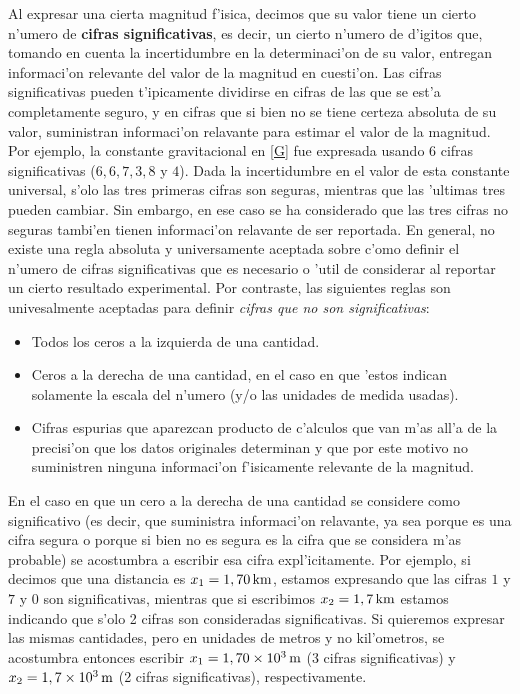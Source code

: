 Al expresar una cierta magnitud f'isica, decimos que su valor tiene un cierto n'umero de \textbf{cifras significativas}, es decir, un cierto n'umero de d'igitos que, tomando en cuenta la incertidumbre en la determinaci'on de su valor, entregan informaci'on relevante del valor de la magnitud en cuesti'on. Las cifras significativas pueden t'ipicamente dividirse en cifras de las que se est'a completamente seguro, y en cifras que si bien no se tiene certeza absoluta de su valor, suministran informaci'on relavante para estimar el valor de la magnitud. Por ejemplo, la constante gravitacional en \eqref{G} fue expresada usando 6 cifras significativas ($6, 6, 7, 3, 8$ y $4$). Dada la incertidumbre en el valor de esta constante universal, s'olo las tres primeras cifras son seguras, mientras que las 'ultimas tres pueden cambiar. Sin embargo, en ese caso se ha considerado que las tres cifras no seguras tambi'en tienen informaci'on relavante de ser reportada. En general, no existe una regla absoluta y universamente aceptada sobre c'omo definir el n'umero de cifras significativas que es necesario o 'util de considerar al reportar un cierto resultado experimental. Por contraste, las siguientes reglas son univesalmente aceptadas para definir \textit{cifras que no son significativas}:
\begin{itemize}
\item Todos los ceros a la izquierda de una cantidad.
\item Ceros a la derecha de una cantidad, en el caso en que 'estos indican solamente la escala del n'umero (y/o las unidades de medida usadas).
\item Cifras espurias que aparezcan producto de c'alculos que van m'as all'a de la precisi'on que los datos originales determinan y que por este motivo no suministren ninguna informaci'on f'isicamente relevante de la magnitud.
\end{itemize}

En el caso en que un cero a la derecha de una cantidad se considere como significativo (es decir, que suministra informaci'on relavante, ya sea porque es una cifra segura o porque si bien no es segura es la cifra que se considera m'as probable) se acostumbra a escribir esa cifra expl'icitamente. Por ejemplo, si decimos que una distancia es $x_1=1,70{\rm\, km}$, estamos expresando que las cifras $1$ y $7$ y $0$ son significativas, mientras que si escribimos $x_2=1,7{\rm\, km}$ estamos indicando que s'olo 2 cifras son consideradas significativas. Si quieremos expresar las mismas cantidades, pero en unidades de metros y no kil'ometros, se acostumbra entonces escribir $x_1=1,70\times 10^3{\rm\, m}$ (3 cifras significativas) y $x_2=1,7\times 10^3{\rm\, m}$ (2 cifras significativas), respectivamente.

